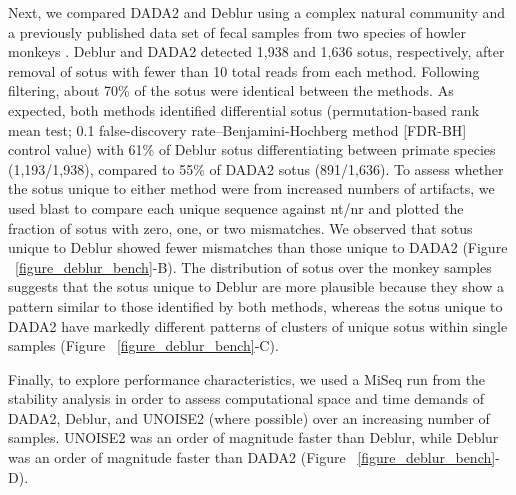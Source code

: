 Next, we compared DADA2 and Deblur using a complex natural community and a previously
published data set of fecal samples from two species of howler monkeys \cite{Amato2016}.
Deblur and DADA2 detected 1,938 and 1,636 s\gls{otu}s, respectively, after removal
of s\gls{otu}s with fewer than 10 total reads from each method. Following filtering,
about 70\% of the s\gls{otu}s were identical between the methods. As expected, both
methods identified differential s\gls{otu}s (permutation-based rank mean test;
0.1 false-discovery rate–Benjamini-Hochberg method [FDR-BH] control value) with 61\%
of Deblur s\gls{otu}s differentiating between primate species (1,193/1,938),
compared to 55\% of DADA2 s\gls{otu}s (891/1,636). To assess whether the
s\gls{otu}s unique to either method were from increased numbers of artifacts,
we used \gls{blast} \cite{Altschul1990} to compare each unique sequence against
nt/nr and plotted the fraction of s\gls{otu}s with zero, one, or two mismatches.
We observed that s\gls{otu}s unique to Deblur showed fewer mismatches than those
unique to DADA2 (Figure ~\ref{figure_deblur_bench}-B). The distribution of
s\gls{otu}s over the monkey samples suggests that the s\gls{otu}s unique to Deblur
are more plausible because they show a pattern similar to those identified by both
methods, whereas the s\gls{otu}s unique to DADA2 have markedly different patterns
of clusters of unique s\gls{otu}s within single samples (Figure ~\ref{figure_deblur_bench}-C).

Finally, to explore performance characteristics, we used a MiSeq run from the
stability analysis in order to assess computational space and time demands of DADA2,
Deblur, and UNOISE2 (where possible) over an increasing number of samples.
UNOISE2 was an order of magnitude faster than Deblur, while Deblur was an order of
magnitude faster than DADA2 (Figure ~\ref{figure_deblur_bench}-D).

